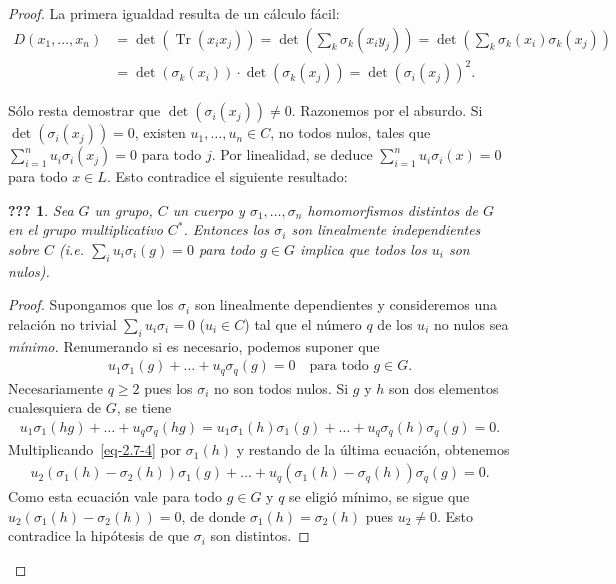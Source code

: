 \documentclass[oneside,bibtotoc,leqno,spanish]{amsbook}
\newcommand{\QED}{}%
\DeclareMathOperator{\Tr}{Tr}
\numberwithin{equation}{section}
\theoremstyle{defi}
\theoremstyle{note}
\newcommand{\namedname}{???}
\newtheorem*{namedthm}{\namedname}
\newenvironment{named}[1]%
	{\renewcommand{\namedname}{#1}%
	\begin{namedthm}}%
	{\end{namedthm}}
\theoremstyle{rem}
\numberwithin{theorem}{section}
\numberwithin{proposition}{section}
\numberwithin{definition}{section}
\numberwithin{lemma}{section}
\numberwithin{corollary}{section}
\numberwithin{example}{section}
\numberwithin{footnote}{section}%
\begin{document}
\begin{proof}
La primera igualdad resulta de un c\'alculo f\'acil:
\begin{align*}
D(x_{1},\dots,x_{n}) &= \det(\Tr(x_{i}x_{j})) = \det\left(\sum_{k}\sigma_{k}(x_{i}y_{j})\right)
= \det\left(\sum_{k}\sigma_{k}(x_{i})\sigma_{k}(x_{j})\right)\\
&= \det(\sigma_{k}(x_{i}))\cdot\det(\sigma_{k}(x_{j})) = \det(\sigma_{i}(x_{j}))^{2}.
\end{align*}

S\'olo resta demostrar que $\det(\sigma_{i}(x_{j}))\neq 0$. Razonemos por el absurdo. Si $\det(\sigma_{i}(x_{j})) = 0$,
existen $u_{1},\dots,u_{n}\in C$, no todos nulos, tales que $\sum_{i=1}^{n}u_{i}\sigma_{i}(x_{j}) = 0$ para todo $j$.
Por linealidad, se deduce $\sum_{i=1}^{n}u_{i}\sigma_{i}(x) = 0$ para todo $x\in L$. Esto contradice el siguiente
resultado:

\begin{named}{Lema de Dedekind}
Sea $G$ un grupo, $C$ un cuerpo y $\sigma_{1},\dots,\sigma_{n}$ homomorfismos distintos de $G$ en el grupo
multiplicativo $C^{*}$. Entonces los $\sigma_{i}$ son linealmente independientes sobre $C$ (i.e.
$\sum_{i}u_{i}\sigma_{i}(g) = 0$ para todo $g\in G$ implica que todos los $u_{i}$ son nulos{\upshape).}
\end{named}

\begin{proof}
Supongamos que los $\sigma_{i}$ son linealmente dependientes y consideremos una relaci\'on no trivial
$\sum_{i}u_{i}\sigma_{i} = 0$ ($u_{i}\in C$) tal que el n\'umero $q$ de los $u_{i}$ no nulos sea {\em
m\'inimo.} Renumerando si es necesario, podemos suponer que
\begin{gather}\label{eq-2.7-4}
u_{1}\sigma_{1}(g) +\dots+u_{q}\sigma_{q}(g) = 0\quad\text{para todo $g\in G$}.
\end{gather}
Necesariamente $q\geq 2$ pues los $\sigma_{i}$ no son todos nulos. Si $g$ y $h$ son dos elementos
cualesquiera de $G$, se tiene
\begin{gather*}
u_{1}\sigma_{1}(hg) + \dots + u_{q}\sigma_{q}(hg) = u_{1}\sigma_{1}(h)\sigma_{1}(g)+\dots+u_{q}\sigma_{q}(h)\sigma_{q}(g) = 0.
\end{gather*}
Multiplicando~\eqref{eq-2.7-4} por $\sigma_{1}(h)$ y restando de la \'ultima ecuaci\'on, obtenemos
\begin{gather*}
u_{2}(\sigma_{1}(h)-\sigma_{2}(h))\sigma_{1}(g)+\dots+u_{q}(\sigma_{1}(h)-\sigma_{q}(h))\sigma_{q}(g) = 0.
\end{gather*}
Como esta ecuaci\'on vale para todo $g\in G$ y $q$ se eligi\'o m\'inimo, se sigue que
$u_{2}(\sigma_{1}(h)-\sigma_{2}(h)) = 0$, de donde $\sigma_{1}(h) = \sigma_{2}(h)$ pues $u_{2}\neq 0$.
Esto contradice la hip\'otesis de que $\sigma_{i}$ son distintos. \QED
\end{proof}
\end{proof}
\end{document}
